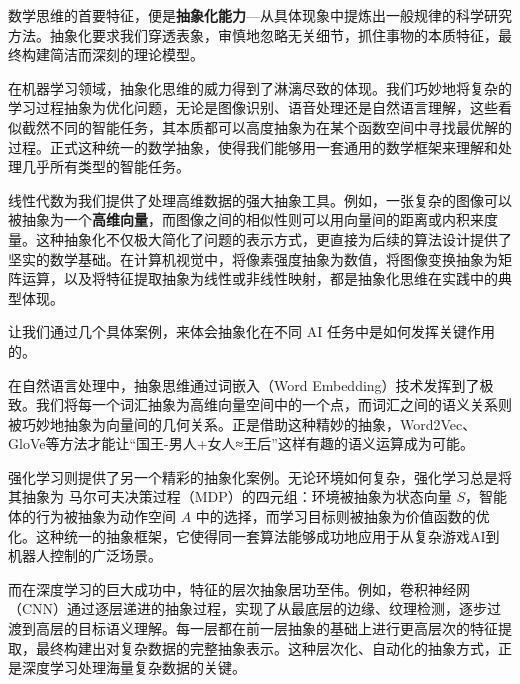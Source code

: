 数学思维的首要特征，便是{\bf 抽象化能力}---从具体现象中提炼出一般规律的科学研究方法。抽象化要求我们穿透表象，审慎地忽略无关细节，抓住事物的本质特征，最终构建简洁而深刻的理论模型。

在机器学习领域，抽象化思维的威力得到了淋漓尽致的体现。我们巧妙地将复杂的学习过程抽象为优化问题，无论是图像识别、语音处理还是自然语言理解，这些看似截然不同的智能任务，其本质都可以高度抽象为在某个函数空间中寻找最优解的过程。正式这种统一的数学抽象，使得我们能够用一套通用的数学框架来理解和处理几乎所有类型的智能任务。

线性代数为我们提供了处理高维数据的强大抽象工具。例如，一张复杂的图像可以被抽象为一个\textbf{高维向量}，而图像之间的相似性则可以用向量间的距离或内积来度量。这种抽象化不仅极大简化了问题的表示方式，更直接为后续的算法设计提供了坚实的数学基础。在计算机视觉中，将像素强度抽象为数值，将图像变换抽象为矩阵运算，以及将特征提取抽象为线性或非线性映射，都是抽象化思维在实践中的典型体现。

让我们通过几个具体案例，来体会抽象化在不同 AI 任务中是如何发挥关键作用的。

在自然语言处理中，抽象思维通过词嵌入（Word Embedding）技术发挥到了极致。我们将每一个词汇抽象为高维向量空间中的一个点，而词汇之间的语义关系则被巧妙地抽象为向量间的几何关系。正是借助这种精妙的抽象，Word2Vec、GloVe等方法才能让``国王-男人+女人≈王后''这样有趣的语义运算成为可能。

强化学习则提供了另一个精彩的抽象化案例。无论环境如何复杂，强化学习总是将其抽象为 马尔可夫决策过程（MDP）的四元组：环境被抽象为状态向量 $S$，智能体的行为被抽象为动作空间 $A$ 中的选择，而学习目标则被抽象为价值函数的优化。这种统一的抽象框架，它使得同一套算法能够成功地应用于从复杂游戏AI到机器人控制的广泛场景。

而在深度学习的巨大成功中，特征的层次抽象居功至伟。例如，卷积神经网（CNN）通过逐层递进的抽象过程，实现了从最底层的边缘、纹理检测，逐步过渡到高层的目标语义理解。每一层都在前一层抽象的基础上进行更高层次的特征提取，最终构建出对复杂数据的完整抽象表示。这种层次化、自动化的抽象方式，正是深度学习处理海量复杂数据的关键。



